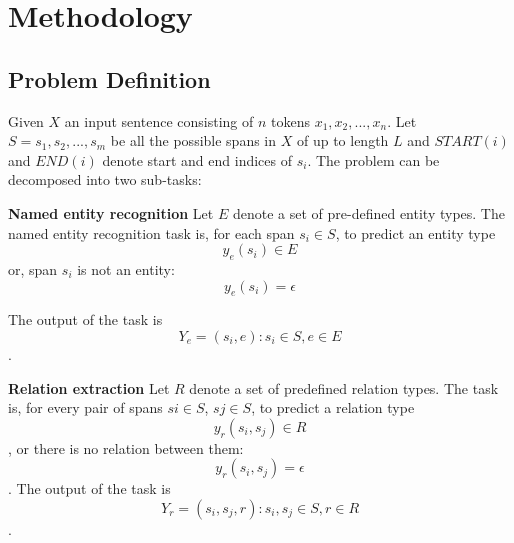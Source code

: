 \chapter{Methodology}
\label{chp:methodology}

\section{Problem Definition}
Given \(X\) an input sentence consisting of \(n\) tokens \(x_1,x_2,...,x_n\). Let \(S = {s_1, s_2,...,s_m}\) be all the possible spans in \(X\) of up to length \(L\) and \(START(i)\) and \(END(i)\) denote start and end indices of \(s_i\). The problem can be decomposed into two sub-tasks:

\textbf{Named entity recognition} Let \(E\) denote a set of pre-defined entity types. The named entity recognition task is, for each span \(s_i \in S\), to predict an entity type \[y_e(s_i) \in E\] or, span \(s_i\) is not an entity: \[y_e(s_i) =\epsilon\]

The output of the task is \[Y_e = {(s_i , e) : s_i \in S, e \in E}\].


\textbf{Relation extraction} Let \(R\) denote a set of predefined relation types. The task is, for every pair of spans \(si \in S\), \(sj \in S\), to predict a relation type \[y_r(s_i , s_j ) \in R\], or there is no relation between them: \[y_r(s_i , s_j ) =\epsilon\]. The output of the task is \[Y_r = {(s_i , s_j , r) : s_i , s_j \in S, r \in R}\].